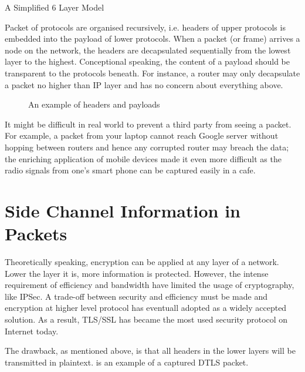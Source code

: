 \begin{table}[H]
\begin{center}
{}
\end{center}
\caption{A Simplified 6 Layer Model}
\label{Tbl: OSI}
\end{table}

Packet of protocols are organised recursively, i.e. headers of upper protocols is embedded into the payload of lower protocols. When a packet (or frame) arrives a node on the network, the headers are decapsulated sequentially from the lowest layer to the highest. Conceptional speaking, the content of a payload should be transparent to the protocols beneath. For instance, a router may only decapsulate a packet no higher than IP layer and has no concern about everything above.

\begin{figure}[H]
\centering
\resizebox{12cm}{!}
{}
\caption{An example of headers and payloads}
\label{Fig: Header and payloads}
\end{figure}

It might be difficult in real world to prevent a third party from seeing a packet. For example, a packet from your laptop cannot reach Google server without hopping between routers and hence any corrupted router may breach the data; the enriching application of mobile devices made it even more difficult as the radio signals from one’s smart phone can be captured easily in a cafe.

\section{Side Channel Information in Packets}
Theoretically speaking, encryption can be applied at any layer of a network. Lower the layer it is, more information is protected. However, the intense requirement of efficiency and bandwidth have limited the usage of cryptography, like IPSec. A trade-off between security and efficiency must be made and encryption at higher level protocol has eventuall adopted as a widely accepted solution. As a result, TLS/SSL has became the most used security protocol on Internet today.

The drawback, as mentioned above, is that all headers in the lower layers will be transmitted in plaintext.  is an example of a captured DTLS packet. 


